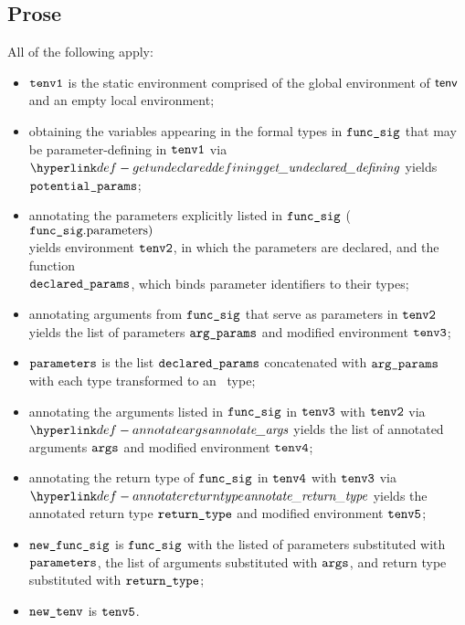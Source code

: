 \subsection{Prose}
All of the following apply:
\begin{itemize}
  \item $\texttt{tenv1}$ is the static environment comprised of the global environment of $\textsf{tenv}$ and an empty local environment;
  \item obtaining the variables appearing in the formal types in $\texttt{func\_sig}$ that may be parameter-defining
        in $\texttt{tenv1}$ via $\getundeclareddefining$ yields \\ $\texttt{potential\_params}$;
  \item annotating the parameters explicitly listed in $\texttt{func\_sig}$ ($\texttt{func\_sig}.\text{parameters})$ \\
        yields environment $\texttt{tenv2}$, in which the parameters are declared,
        and the function \\
        $\texttt{declared\_params}$, which binds parameter identifiers to their types\ProseOrTypeError;
  \item annotating arguments from $\texttt{func\_sig}$ that serve as parameters in $\texttt{tenv2}$ yields the list of parameters
        $\texttt{arg\_params}$ and modified environment $\texttt{tenv3}$\ProseOrTypeError;
  \item $\texttt{parameters}$ is the list $\texttt{declared\_params}$ concatenated with $\texttt{arg\_params}$ with each type
        transformed to an \optional\ type;
  \item annotating the arguments listed in $\texttt{func\_sig}$ in $\texttt{tenv3}$ with $\texttt{tenv2}$ via \\
        $\annotateargs$ yields the list of annotated
        arguments $\texttt{args}$ and modified environment $\texttt{tenv4}$\ProseOrTypeError;
  \item annotating the return type of $\texttt{func\_sig}$ in $\texttt{tenv4}$ with $\texttt{tenv3}$ via \\ $\annotatereturntype$ yields
        the annotated return type $\texttt{return\_type}$ and modified environment $\texttt{tenv5}$\ProseOrTypeError;
  \item $\texttt{new\_func\_sig}$ is $\texttt{func\_sig}$ with the listed of parameters substituted with \\ $\texttt{parameters}$,
        the list of arguments substituted with $\texttt{args}$, and return type substituted with $\texttt{return\_type}$;
  \item $\texttt{new\_tenv}$ is $\texttt{tenv5}$.
\end{itemize}

